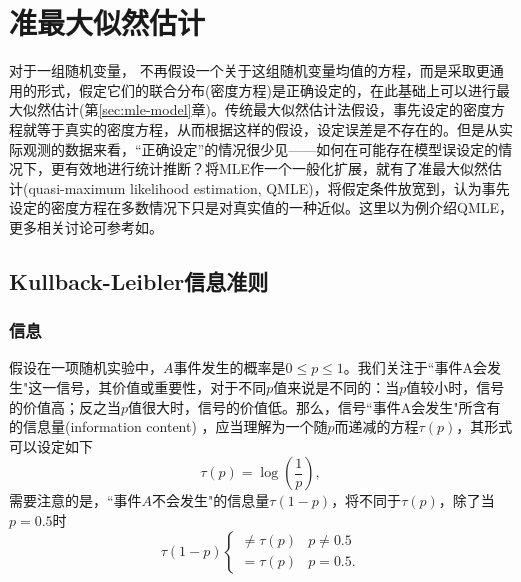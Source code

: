 \chapter{准最大似然估计}
\label{sec:qmle-model}

对于一组随机变量，
不再假设一个关于这组随机变量均值的方程，而是采取更通用的形式，假定它们的联合分布(密度方程)是正确设定的，在此基础上可以进行最大似然估计(第\ref{sec:mle-model}章)。传统最大似然估计法假设，事先设定的密度方程就等于真实的密度方程，从而根据这样的假设，设定误差是不存在的。但是从实际观测的数据来看，``正确设定”的情况很少见——如何在可能存在模型误设定的情况下，更有效地进行统计推断？将MLE作一个一般化扩展，就有了准最大似然估计(quasi-maximum likelihood estimation, QMLE)，将假定条件放宽到，认为事先设定的密度方程在多数情况下只是对真实值的一种近似。这里以\cite{White:1994vu}为例介绍QMLE，更多相关讨论可参考如\cite{White:1982bm, Amemiya:1985uq, Gourieroux:1993bj, Chen:2013bk}。

\section{Kullback-Leibler信息准则}
\label{sec:qmle-klic-intro}

\subsection{信息}
\label{sec:qmle-klic-information}

假设在一项随机实验中，$A$事件发生的概率是$0 \le p \le 1$。我们关注于``事件A会发生"这一信号，其价值或重要性，对于不同$p$值来说是不同的：当$p$值较小时，信号的价值高；反之当$p$值很大时，信号的价值低。那么，信号``事件A会发生"所含有的信息量(information content) ，应当理解为一个随$p$而递减的方程$\tau \left(p \right)$，其形式可以设定如下
\begin{equation*}
    \tau \left( p \right) = \log \left( \frac{1}{p} \right),
\end{equation*}
需要注意的是，``事件$A$不会发生"的信息量$\tau \left( 1 - p \right)$，将不同于$\tau \left( p \right)$，除了当$p=0.5$时
\begin{equation}
    \tau(1-p)
    \begin{cases}
        \neq \tau(p) & p \neq 0.5 \\
        = \tau \left( p \right)  & p = 0.5 .
    \end{cases}
\end{equation}

